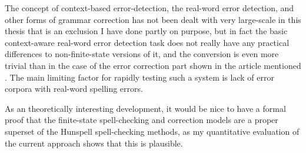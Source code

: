 \documentclass[officiallayout]{unihelcompling}
\begin{document}
The concept of context-based error-detection, the real-word error detection,
and other forms of grammar correction has not been dealt with very large-scale
in this thesis that is an exclusion I have done partly on purpose, but in
fact the basic context-aware real-word error detection task does not really
have any practical differences to non-finite-state versions of it, and the
conversion is even more trivial than in the case of the error correction part
shown in the article mentioned . The main
limiting factor for rapidly testing such a system is lack of error corpora
with real-word spelling errors.

As an theoretically interesting development, it would be nice to have a formal
proof that the finite-state spell-checking and correction models are a proper
superset of the Hunspell spell-checking methods, as my quantitative
evaluation of the current approach shows that this is plausible.



\end{document}
